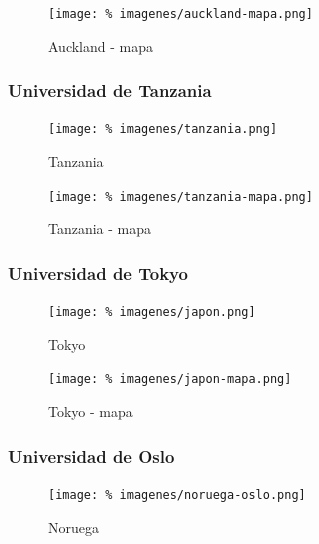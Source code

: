 \documentclass[final,inline,a4paper,narroweqnarray]{ieee}
\let\Oldsubsubsection\subsubsection
\renewcommand{\subsubsection}{\FloatBarrier\Oldsubsubsection}
\begin{document}
\begin{figure}[ht]\begin{center}
   \texttt{[image: \%
    imagenes/auckland-mapa.png]}
    \caption{Auckland - mapa}
    \label{Auckland}
\end{center}\end{figure}

\subsubsection{Universidad de Tanzania}
\begin{figure}[ht]\begin{center}
   \texttt{[image: \%
    imagenes/tanzania.png]}
    \caption{Tanzania}
    \label{Tanzania}
\end{center}\end{figure}

\begin{figure}[ht]\begin{center}
   \texttt{[image: \%
    imagenes/tanzania-mapa.png]}
    \caption{Tanzania - mapa}
    \label{Tanzania}
\end{center}\end{figure}

\subsubsection{Universidad de Tokyo}
\begin{figure}[ht]\begin{center}
   \texttt{[image: \%
    imagenes/japon.png]}
    \caption{Tokyo}
    \label{Tokyo}
\end{center}\end{figure}

\begin{figure}[ht]\begin{center}
   \texttt{[image: \%
    imagenes/japon-mapa.png]}
    \caption{Tokyo - mapa}
    \label{Tokyo}
\end{center}\end{figure}

\subsubsection{Universidad de Oslo}
\begin{figure}[ht]\begin{center}
   \texttt{[image: \%
    imagenes/noruega-oslo.png]}
    \caption{Noruega}
    \label{Noruega}
\end{center}\end{figure}
\end{document}
